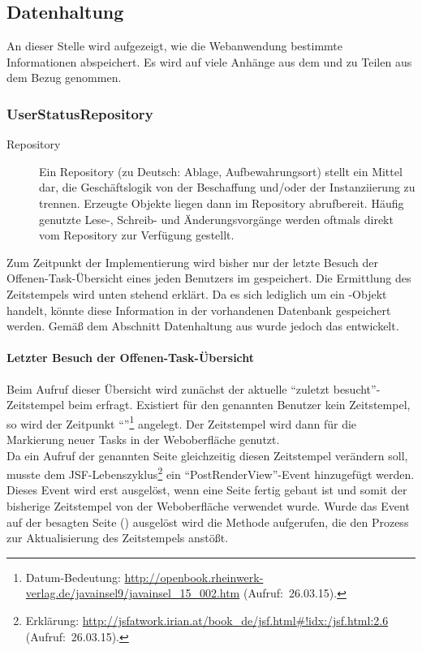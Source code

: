 \subsection{Datenhaltung}
\label{sub:Datenhaltung}
An dieser Stelle wird aufgezeigt, wie die Webanwendung bestimmte Informationen abspeichert. Es wird auf viele Anhänge aus dem
 und zu Teilen aus dem  Bezug genommen.

\subsubsection{UserStatusRepository}
\label{subsub:UserStatusRepository}
\begin{description}
	\item [Repository]
Ein Repository (zu Deutsch: Ablage, Aufbewahrungsort) stellt ein Mittel dar, die Geschäftslogik von der Beschaffung
und/oder der Instanziierung zu trennen. Erzeugte Objekte liegen dann im Repository abrufbereit. Häufig genutzte Lese-, Schreib-
und Änderungsvorgänge werden oftmals direkt vom Repository zur Verfügung gestellt. \citep[vgl.][]{Repository}
\end{description}

Zum Zeitpunkt der Implementierung wird bisher nur der letzte Besuch der Offenen-Task-Übersicht eines jeden Benutzers im
 gespeichert. Die Ermittlung des Zeitstempels wird unten stehend erklärt. Da es sich lediglich um ein
-Objekt handelt, könnte diese Information in der vorhandenen Datenbank gespeichert werden. Gemäß dem Abschnitt
Datenhaltung aus  wurde jedoch das  entwickelt.

\paragraph{Letzter Besuch der Offenen-Task-Übersicht}
\label{para:Offene-Task-Übersicht}
Beim Aufruf dieser Übersicht wird zunächst der aktuelle "`zuletzt besucht"'-Zeitstempel beim 
erfragt. Existiert für den genannten Benutzer kein Zeitstempel, so wird der Zeitpunkt "`"'\footnote{Datum-Bedeutung: \url{http://openbook.rheinwerk-verlag.de/javainsel9/javainsel_15_002.htm}
(Aufruf:~26.03.15).} angelegt. Der Zeitstempel wird dann für die Markierung neuer Tasks in der Weboberfläche genutzt.\\
Da ein Aufruf der genannten Seite gleichzeitig diesen Zeitstempel verändern soll, musste dem JSF-Lebenszyklus\footnote{Erklärung:
\url{http://jsfatwork.irian.at/book_de/jsf.html\#!idx:/jsf.html:2.6} (Aufruf:~26.03.15).} ein "`PostRenderView"'-Event hinzugefügt
werden. Dieses Event wird erst ausgelöst, wenn eine Seite fertig gebaut ist und somit der bisherige Zeitstempel von der
Weboberfläche verwendet wurde. Wurde das Event auf der besagten Seite () ausgelöst wird die Methode
 aufgerufen, die den Prozess zur Aktualisierung des Zeitstempels anstößt.

